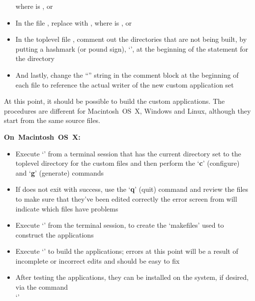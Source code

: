 \begin{itemize}
where  is ,  or\\
\item\exSp{} In the file , replace
 with ,
where  is ,  or 
\item\exSp{} In the top\longDash{}level file , comment out the
directories that are not being built, by putting a hash\longDash{}mark (or pound sign),
`\asCode{\#}', at the beginning of the  statement
for the directory
\item\exSp{} And lastly, change the ``'' string in the comment block at
the beginning of each file to reference the actual writer of the new custom application
set
\end{itemize}
\tertiaryEnd
{}
At this point, it should be possible to build the custom applications.
The procedures are different for Macintosh~OS~X, Windows and Linux, although they start
from the same source files. 
\begin{center}\textbf{On~Macintosh~OS~X:}\end{center}
\begin{itemize}
\item Execute `' from a terminal session that has the current directory
set to the top\longDash{}level directory for the custom files and then perform the
`\textbf{c}' (configure) and `\textbf{g}' (generate) commands
\item\exSp{} If  does not exit with success, use the `\textbf{q}' (quit)
command and review the  files to make sure that they've been edited
correctly \longDash{} the error screen from  will indicate which files have
problems
\item\exSp{} Execute `' from the terminal session, to create the
`makefiles' used to construct the applications
\item\exSp{} Execute `' to build the applications; errors at
this point will be a result of incomplete or incorrect edits and should be easy to fix
\item\exSp{} After testing the applications, they can be installed on the system, if
desired, via the command\\
`'
\end{itemize}

